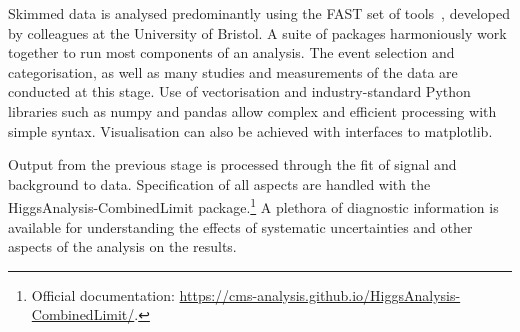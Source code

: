 Skimmed data is analysed predominantly using the FAST set of tools~\cite{fast_hep_epj}, developed by colleagues at the University of Bristol. A suite of packages harmoniously work together to run most components of an analysis. The event selection and categorisation, as well as many studies and measurements of the data are conducted at this stage. Use of vectorisation and industry-standard Python libraries such as \textsf{numpy} and \textsf{pandas} allow complex and efficient processing with simple syntax. Visualisation can also be achieved with interfaces to \textsf{matplotlib}.

Output from the previous stage is processed through the fit of signal and background to data. Specification of all aspects are handled with the \textsf{HiggsAnalysis-CombinedLimit} package.\footnote{Official documentation: \url{https://cms-analysis.github.io/HiggsAnalysis-CombinedLimit/}.} A plethora of diagnostic information is available for understanding the effects of systematic uncertainties and other aspects of the analysis on the results.
